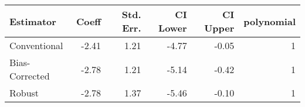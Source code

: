\begin{tabular}{lrrrrr}
  \hline
Estimator & Coeff & Std. Err. & CI Lower & CI Upper & polynomial \\ 
  \hline
Conventional & -2.41 & 1.21 & -4.77 & -0.05 &   1 \\ 
  Bias-Corrected & -2.78 & 1.21 & -5.14 & -0.42 &   1 \\ 
  Robust & -2.78 & 1.37 & -5.46 & -0.10 &   1 \\ 
   \hline
\end{tabular}
